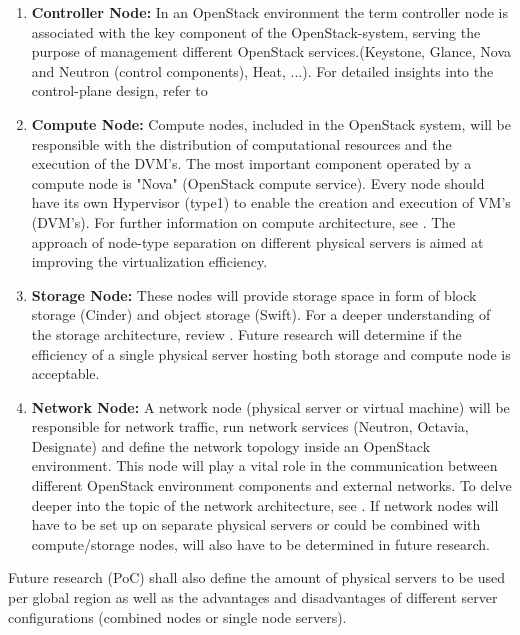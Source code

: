 \documentclass[]{article}
\begin{document}
\begin{enumerate}[label=\textbullet]
	\item\textbf{Controller Node:}
	In an OpenStack environment the term controller node is associated with the key component of the OpenStack-system, serving the purpose of management different OpenStack services.(Keystone, Glance, Nova and Neutron (control components), Heat, ...). 
	For detailed insights into the control-plane design, refer to \cite{OpenStackDoc-control}
			
	\item\textbf{Compute Node:}
	Compute nodes, included in the OpenStack system, will be responsible with the distribution of computational resources and the execution of the DVM's. 
	The most important component operated by a compute node is "Nova" (OpenStack compute service).
	Every node should have its own Hypervisor (type1) to enable the creation and execution of VM's (DVM's). 
	For further information on compute architecture, see \cite{OpenStackDoc-compute}. 
	The approach of node-type separation on different physical servers is aimed at improving the virtualization efficiency.

	\item\textbf{Storage Node:}
	These nodes will provide storage space in form of block storage (Cinder) and object storage (Swift). 
	For a deeper understanding of the storage architecture, review \cite{OpenStackDoc-storage}.
 	Future research will determine if the efficiency of a single physical server hosting both storage and compute node is acceptable. 
  
	\item\textbf{Network Node:}
	A network node (physical server or virtual machine) will be responsible for network traffic, run network services (Neutron, Octavia, Designate) and define the network topology inside an OpenStack environment. 
	This node will play a vital role in the communication between different OpenStack environment components and external networks. 
	To delve deeper into the topic of the network architecture, see \cite{OpenStackDoc-network}. 
	If network nodes will have to be set up on separate physical servers or could be combined with compute/storage nodes, will also have to be determined in future research. 
\end{enumerate}

Future research (PoC) shall also define the amount of physical servers to be used per global region as well as the advantages and disadvantages of different server configurations (combined nodes or single node servers).
\newline
\end{document}
